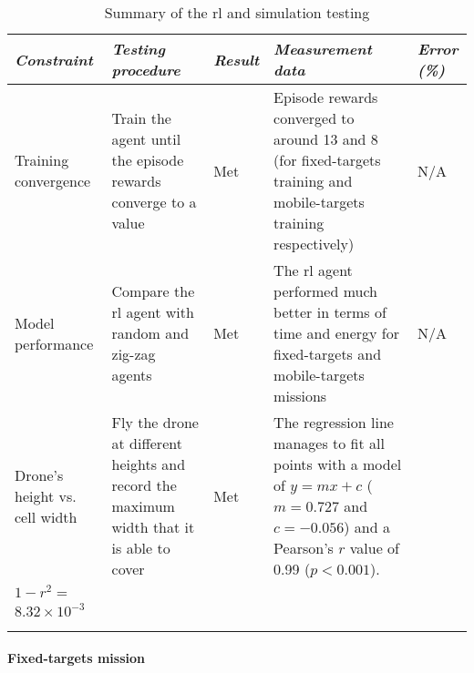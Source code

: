 \documentclass[../main.tex]{subfiles}
\begin{document}
\begin{table}[tbp]
    \centering
    \caption{Summary of the \gls{rl} and simulation testing}
    \label{tab:rl-testing-summary}
    \begin{tabularx}{\textwidth}{ X X l X l }
        \toprule
        \textit{Constraint} 
            & \textit{Testing procedure} 
                & \textit{Result}
        & \textit{Measurement data} 
            & \textit{Error (\%)} \\

        \midrule
        
        
        \raggedright Training convergence    
            & Train the agent until the episode rewards converge to a
            value
        & Met
        & Episode rewards converged to around 13 and 8 (for fixed-targets training
        and mobile-targets training respectively)
        & N/A \\
        \addlinespace

        \raggedright Model performance
        & Compare the \gls{rl} agent with random and zig-zag agents
        & Met
        & The \gls{rl} agent performed much better in terms of time
        and energy for fixed-targets and mobile-targets missions
        & N/A \\
        \addlinespace

        \raggedright Drone's height vs. cell width
        & Fly the drone at different heights and record the maximum
        width that it is able to cover
        & Met
        & The regression line manages to fit all points with a model
        of $y=mx+c$ ($m=0.727$ and $c=-0.056$) and a
        Pearson's $r$ value of 0.99 ($p < 0.001$).
        & 
        \begin{tabular}{l}
            \\
            $1-r^2 =$ \\
            $8.32\times 10^{-3}$ \\
        \end{tabular}
        \\
        \addlinespace

        \bottomrule		
    \end{tabularx}
\end{table}

\paragraph{Fixed-targets mission}
\end{document}
